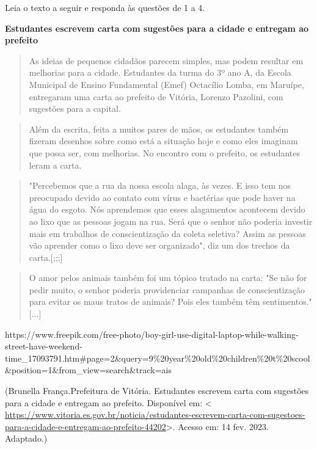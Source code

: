 
Leia o texto a seguir e responda às questões de 1 a 4.

\textbf{Estudantes escrevem carta com sugestões para a cidade e entregam
ao prefeito}

\begin{quote}
As ideias de pequenos cidadãos parecem simples, mas podem resultar em
melhorias para a cidade. Estudantes da turma do 3º ano A, da Escola
Municipal de Ensino Fundamental (Emef) Octacílio Lomba, em Maruípe,
entregaram uma carta ao prefeito de Vitória, Lorenzo Pazolini, com
sugestões para a capital.
\end{quote}

\begin{quote}
Além da escrita, feita a muitos pares de mãos, os estudantes também
fizeram desenhos sobre como está a situação hoje e como eles imaginam
que possa ser, com melhorias. No encontro com o prefeito, os estudantes
leram a carta.
\end{quote}

\begin{quote}
"Percebemos que a rua da nossa escola alaga, às vezes. E isso tem nos
preocupado devido ao contato com vírus e bactérias que pode haver na
água do esgoto. Nós aprendemos que esses alagamentos acontecem devido ao
lixo que as pessoas jogam na rua. Será que o senhor não poderia investir
mais em trabalhos de conscientização da coleta seletiva? Assim as
pessoas vão aprender como o lixo deve ser organizado", diz um dos
trechos da carta.{[};;;{]}
\end{quote}

\begin{quote}
O amor pelos animais também foi um tópico tratado na carta: "Se não for
pedir muito, o senhor poderia providenciar campanhas de conscientização
para evitar os maus tratos de animais? Pois eles também têm
sentimentos." {[}...{]}
\end{quote}

https://www.freepik.com/free-photo/boy-girl-use-digital-laptop-while-walking-street-have-weekend-time\_17093791.htm\#page=2\&query=9\%20year\%20old\%20children\%20t\%20scool\&position=1\&from\_view=search\&track=ais

(Brunella França.Prefeitura de Vitória. Estudantes escrevem carta com
sugestões para a cidade e entregam ao prefeito. Disponível em:
\textless{}
\url{https://www.vitoria.es.gov.br/noticia/estudantes-escrevem-carta-com-sugestoes-para-a-cidade-e-entregam-ao-prefeito-44202}\textgreater.
Acesso em: 14 fev. 2023. Adaptado.)

